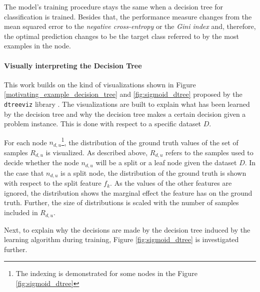     The model's training procedure stays the same when a decision tree for classification is trained. Besides that, the performance measure changes from the mean squared error to the \emph{negative cross-entropy} or the \emph{Gini index} and, therefore, the optimal prediction changes to be the target class referred to by the most examples in the node.
    
    \paragraph{Visually interpreting the Decision Tree} This work builds on the kind of visualizations shown in Figure \ref{motivating_example_decision_tree} and \ref{fig:sigmoid_dtree} proposed by the \texttt{dtreeviz} library \cite{dtreeviz}. The visualizations are built to explain what has been learned by the decision tree and why the decision tree makes a certain decision given a problem instance. This is done with respect to a specific dataset $D$.
    
    For each node $n_{d,u}$\footnote{The indexing is demonstrated for some nodes in the Figure \ref{fig:sigmoid_dtree}}, the distribution of the ground truth values of the set of samples $R_{d,u}$ is visualized. As described above, $R_{d,u}$ refers to the samples used to decide whether the node $n_{d,u}$ will be a split or a leaf node given the dataset $D$. In the case that $n_{d,u}$ is a split node, the distribution of the ground truth is shown with respect to the split feature $f_k$. As the values of the other features are ignored, the distribution shows the marginal effect the feature has on the ground truth. Further, the size of distributions is scaled with the number of samples included in $R_{d,u}$. 
    
    Next, to explain why the decisions are made by the decision tree induced by the learning algorithm during training, Figure \ref{fig:sigmoid_dtree} is investigated further.
    

